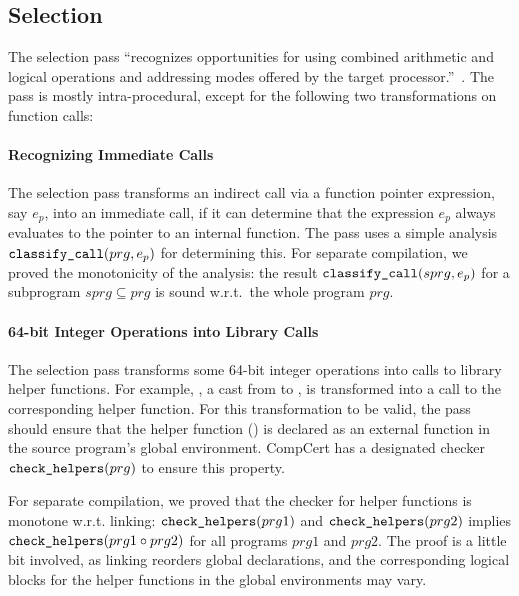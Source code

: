 \subsection{Selection}

The selection pass ``recognizes opportunities for using combined arithmetic and logical operations
and addressing modes offered by the target processor.''~\cite{compcert-website}.  The pass is mostly
intra-procedural, except for the following two transformations on function calls:

\paragraph{Recognizing Immediate Calls}
The selection pass transforms an indirect call via a function pointer expression, say $e_p$, into an
immediate call, if it can determine that the expression $e_p$ always evaluates to the pointer to an
internal function.  The pass uses a simple analysis $\texttt{classify\_call}(prg, e_p)$ for
determining this.  For separate compilation, we proved the monotonicity of the analysis: the result
$\texttt{classify\_call}(sprg, e_p)$ for a subprogram $sprg \subseteq prg$ is sound w.r.t.\ the whole
program $prg$.

\paragraph{64-bit Integer Operations into Library Calls}
The selection pass transforms some 64-bit integer operations into calls to library helper functions.
For example, , a cast from  to , is transformed into
a call  to the corresponding helper function.  For this transformation to
be valid, the pass should ensure that the helper function (\eg {}) is declared
as an external function in the source program's global environment.  CompCert has a designated
checker $\texttt{check\_helpers}(prg)$ to ensure this property.

For separate compilation, we proved that the checker for helper functions is monotone
w.r.t. linking: $\texttt{check\_helpers}(prg1)$ and $\texttt{check\_helpers}(prg2)$ implies \\
$\texttt{check\_helpers}(prg1 \circ prg2)$ for all programs $prg1$ and $prg2$.  The proof is a little
bit involved, as linking reorders global declarations, and the corresponding logical blocks for the
helper functions in the global environments may vary.

